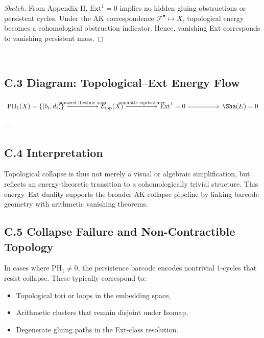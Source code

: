 \begin{proof}[Sketch]
From Appendix H, \( \mathrm{Ext}^1 = 0 \) implies no hidden gluing obstructions or persistent cycles.  
Under the AK correspondence \( \mathcal{F}^\bullet \mapsto X \), topological energy becomes a cohomological obstruction indicator.  
Hence, vanishing Ext corresponds to vanishing persistent mass.
\end{proof}

---

\subsection*{C.3 Diagram: Topological–Ext Energy Flow}

\[
\begin{tikzcd}[row sep=large, column sep=huge]
\mathrm{PH}_1(X) = \{(b_i, d_i)\} \arrow[r, "\text{squared lifetime sum}"] &
\mathcal{E}_{\text{top}}(X) \arrow[r, "\text{semantic equivalence}"] &
\mathrm{Ext}^1 = 0 \arrow[r, Rightarrow] &
\Sha(E) = 0
\end{tikzcd}
\]

---

\subsection*{C.4 Interpretation}

Topological collapse is thus not merely a visual or algebraic simplification,  
but reflects an energy-theoretic transition to a cohomologically trivial structure.  
This energy–Ext duality supports the broader AK collapse pipeline  
by linking barcode geometry with arithmetic vanishing theorems.

\subsection*{C.5 Collapse Failure and Non-Contractible Topology}

In cases where \( \mathrm{PH}_1 \neq 0 \), the persistence barcode encodes  
nontrivial 1-cycles that resist collapse. These typically correspond to:

\begin{itemize}
  \item Topological tori or loops in the embedding space,
  \item Arithmetic clusters that remain disjoint under Isomap,
  \item Degenerate gluing paths in the Ext-class resolution.
\end{itemize}

